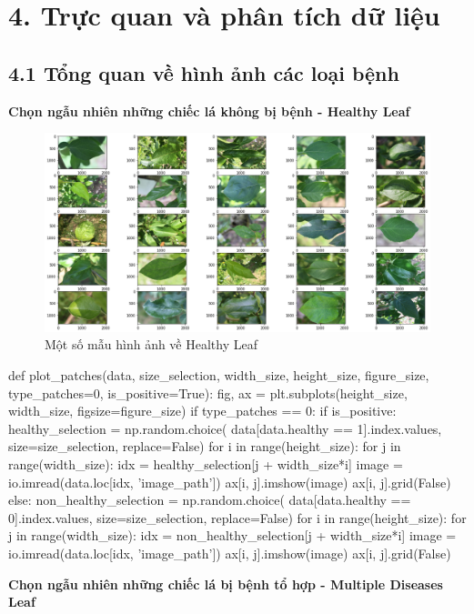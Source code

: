 \documentclass{article}
\begin{document}
	\section{4. Trực quan và phân tích dữ liệu}
	\subsection{4.1 Tổng quan về hình ảnh các loại bệnh}
	\textbf{Chọn ngẫu nhiên những chiếc lá không bị bệnh - Healthy Leaf}
	\begin{figure}[H]
		\centering
		\includegraphics[width=1\linewidth]{images/sample_healthy_leaf.png}
		\caption{Một số mẫu hình ảnh về Healthy Leaf}
		\label{fig:writing-thesis}
	\end{figure}
	\begin{python}
		def plot_patches(data, size_selection, width_size, height_size, figure_size, type_patches=0, is_positive=True):
		fig, ax = plt.subplots(height_size, width_size, figsize=figure_size)
			if type_patches == 0:
				if is_positive:
					healthy_selection = np.random.choice(
					data[data.healthy == 1].index.values, size=size_selection, replace=False)
					for i in range(height_size):
						for j in range(width_size):
						idx = healthy_selection[j + width_size*i]
						image = io.imread(data.loc[idx, 'image_path'])
						ax[i, j].imshow(image)
					ax[i, j].grid(False)
				else:
					non_healthy_selection = np.random.choice(
					data[data.healthy == 0].index.values, size=size_selection, replace=False)
					for i in range(height_size):
						for j in range(width_size):
							idx = non_healthy_selection[j + width_size*i]
							image = io.imread(data.loc[idx, 'image_path'])
							ax[i, j].imshow(image)
							ax[i, j].grid(False)
	\end{python}
	\textbf{Chọn ngẫu nhiên những chiếc lá bị bệnh tổ hợp - Multiple Diseases Leaf}
\end{document}
